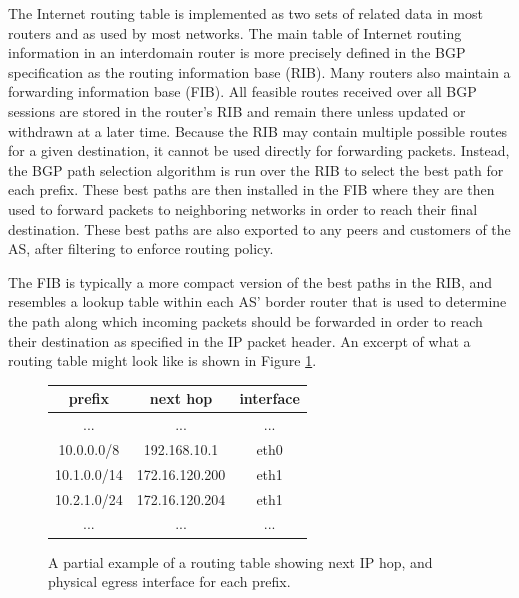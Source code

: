 The Internet routing table is implemented as two sets of related data in most routers and as used by most networks. The main table of Internet routing information in an interdomain router is more precisely defined in the BGP specification \cite{rfc4271} as the routing information base (RIB). Many routers also maintain a forwarding information base (FIB). All feasible routes received over all BGP sessions are stored in the router's RIB and remain there unless updated or withdrawn at a later time. Because the RIB may contain multiple possible routes for a given destination, it cannot be used directly for forwarding packets. Instead, the BGP path selection algorithm is run over the RIB to select the best path for each prefix. These best paths are then installed in the FIB where they are then used to forward packets to neighboring networks in order to reach their final destination. These best paths are also exported to any peers and customers of the AS, after filtering to enforce routing policy.

The FIB is typically a more compact version of the best paths in the RIB, and resembles a lookup table within each AS' border router that is used to determine the path along which incoming packets should be forwarded in order to reach their destination as specified in the IP packet header. An excerpt of what a routing table might look like is shown in Figure \ref{fig:ex_routing_table}.

\begin{figure}[h!]
    \begin{center}
    \begin{singlespace}
        \begin{tabular}{c | c | c}
            prefix & next hop & interface \\
            \hline
            ... & ... & ... \\
            10.0.0.0/8  & 192.168.10.1   & eth0 \\
            10.1.0.0/14 & 172.16.120.200 & eth1 \\
            10.2.1.0/24 & 172.16.120.204 & eth1 \\
            ... & ... & ...
        \end{tabular}
    \end{singlespace}
    \end{center}
\caption[A partial example of a routing table]{A partial example of a routing table showing next IP hop, and physical egress interface for each prefix.}
\label{fig:ex_routing_table}
\end{figure}

